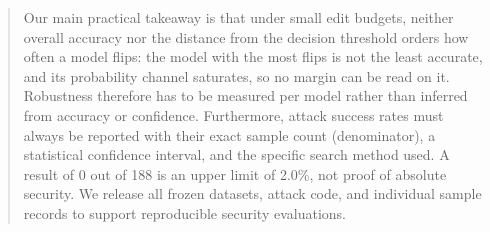 \begin{abstract}
Our main practical takeaway is that under small edit budgets, neither overall
accuracy nor the distance from the decision threshold orders how often a model
flips: the model with the most flips is not the least accurate, and its
probability channel saturates, so no margin can be read on it. Robustness
therefore has to be measured per model rather than inferred from accuracy or
confidence. Furthermore, attack success rates must
always be reported with their exact sample count (denominator), a statistical
confidence interval, and the specific search method used. A result of 0 out of
188 is an upper limit of 2.0\%, not proof of absolute security. We release all
frozen datasets, attack code, and individual sample records to support
reproducible security evaluations.
\end{abstract}